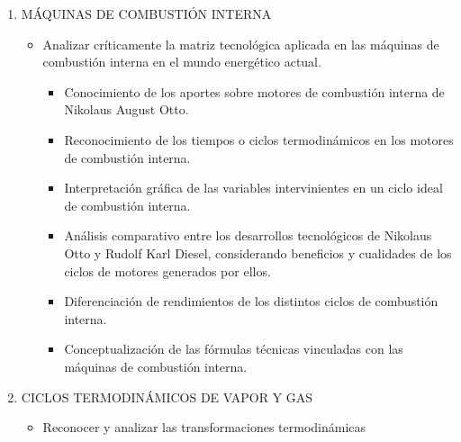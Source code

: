 \documentclass[../main]{subfiles}
\begin{document}
\begin{enumerate}
\begin{itemize}
\begin{itemize}
            energía desde una perspectiva de creación-destrucción.
          \item Análisis crítico del Segundo Principio de la termodinámica
            desde la visión de Clausius y de lo desarrollado por
            Kelvin-Planck.
          \item Reconocimiento de la máquina ideal de Carnot
            contemplando el rendimiento idealista y su reversibilidad.
          \item Análisis de diagramas gráficos relacionados con procesos
            entrópicos.
          \item Formulación del Segundo Principio de la Termodinámica
            desde una perspectiva técnica-industrial.
        \end{itemize}
    \end{itemize}
  \item  MÁQUINAS DE COMBUSTIÓN INTERNA
    \begin{itemize}
      \item Analizar críticamente la matriz tecnológica aplicada en
        las máquinas de combustión interna en el mundo energético actual.
        \begin{itemize}
          \item Conocimiento de los aportes sobre motores de
            combustión interna de Nikolaus August Otto.
          \item Reconocimiento de los tiempos o ciclos termodinámicos
            en los motores de combustión interna.
          \item Interpretación gráfica de las variables intervinientes en un
            ciclo ideal de combustión interna.
          \item Análisis comparativo entre los desarrollos tecnológicos de
            Nikolaus Otto y Rudolf Karl Diesel, considerando
            beneficios y cualidades de los ciclos de motores
            generados por ellos.
          \item Diferenciación de rendimientos de los distintos ciclos de
            combustión interna.
          \item Conceptualización de las fórmulas técnicas vinculadas
            con las máquinas de combustión interna.
        \end{itemize}
    \end{itemize}
  \item CICLOS TERMODINÁMICOS DE VAPOR Y GAS
    \begin{itemize}
      \item Reconocer y analizar las transformaciones termodinámicas

\end{itemize}
\end{enumerate}
\end{document}
